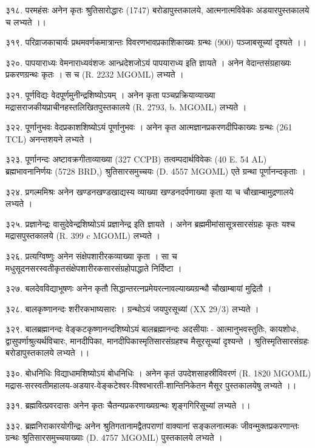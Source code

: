 ३१८. परमहंसः
अनेन कृतः श्रुतिसारोद्धारः (1747) बरोडापुस्तकालये, आत्मनात्मविवेकः अडयारपुस्तकालये च लभ्यते ।।

३१९. परिव्राजकाचार्यः 
प्रथमवर्णकमात्रान्तः विवरणभावप्रकाशिकाख्यः ग्रन्थः (900) पञ्जाबसूच्यां दृश्यते ।।

३२०. पापयाराध्यः
वेमनाराध्यवंशजः आन्ध्रदेशजोऽयं पापयाराध्य इति ज्ञायते । अनेन वेदान्तसंग्रहाख्यः प्रकरणग्रन्थः कृतः । स च (R. 2232 MGOML) लभ्यते ।

३२१. पूर्णविद्यः
वेदपूर्णमुनीन्द्रशिष्योऽयम् । अनेन कृता पञ्चप्रक्रियाव्याख्या मद्रासराजकीयप्राचीनहस्तलिखितपुस्तकालये (R. 2793, b. MGOML) लभ्यते ।

३२२. पूर्णानुभवः
वेदप्रकाशशिष्योऽयं पूर्णानुभवः । अनेन कृत आत्मज्ञानप्रकरणदीपिकाख्यः ग्रन्थः (261 TCL) अनन्तशयने लभ्यते ।

३२३. पूर्णानन्दः
अष्टावक्रगीताव्याख्या (327 CCPB) तत्वम्पदार्थविवेकः (40 E. 54 AL) ब्रह्मभावनानिर्णयः (5728 BRD,) श्रुतिसारसमुच्चयः (D. 4557 MGOML) एते ग्रन्था पूर्णानन्दकृताः ।

३२४. प्रगल्ममिश्रः
अनेन खण्डनखण्डखाद्यस्य व्याख्या खण्डनदर्पणाख्या कृता या च चौखाम्बामुद्रणालये लभ्यते ।

३२५. प्रज्ञानेन्द्रः
वासुदेवेन्द्रशिष्योऽयं प्रज्ञानेन्द्र इति ज्ञायते । अनेन ब्रह्ममीमांसासूत्रसारसंग्रहः कृतः यश्च मद्रासपुस्तकालये (R. 399 c MGOML) लभ्यते ।

३२६. प्रत्यग्विष्णुः
अनेन संक्षेपशारीरकव्याख्या कृता । सा च मधुसूदनसरस्वतीकृतसंक्षेपशारीरकसारसंग्रहोपाद्धाते निर्दिष्टा ।

३२७. बलदेवविद्याभूषणः 
अनेन कृतौ सिद्धान्तरत्नप्रमेयरत्नावल्याख्यग्रन्थौ चौखाम्बायां मुद्रितौ ।

३२८. बालकृष्णानन्दः
शरीरकभाष्यसारः । ग्रन्थोऽयं जयपुरसूच्यां (XX 29/3) लभ्यते ।

३२९. बालब्रह्मानन्दः 
वेङ्कटकृष्णानन्दशिष्योऽयं बालब्रह्मानन्दः अदसीयाः - आत्मानुभवस्तुतिः, कायशोधः, द्वासुपर्णाश्रुत्यर्थविचारः, मानदीपिका, मानदीपिकास्मृतिसारसंग्रहश्च मैसूरसूच्यां दृश्यन्ते । श्रुतिस्मृतिसारसंग्रहः बरोडापुस्तकालये लभ्यते ।।

३३०. बोधनिधिः
विद्याधामशिष्योऽयं बोधनिधिः । अनेन कृतं उपदेशसाहस्रीविवरणं (R. 1820 MGOML) मद्रास-सरस्वतीमहालय-अडयार-वेङ्कटेश्वर-विश्वभारती-शान्तिनिकेतन मैसूर पुस्तकालयेषु लभ्यते ।।

३३१. ब्रह्मवित्प्रवरदासः
अनेन कृतः चैतन्यप्रकरणाख्यग्रन्थः शृङ्गगिरिसूच्यां लभ्यते ।।

३३२. ब्रह्मनिराकारयोगीन्द्रः
अनेन श्रुतिगतानामद्वैतपराणां वाक्यानां सङ्कलनात्मकः जीवन्मुक्तप्रकरणान्तः ग्रन्थः श्रुतिसारसमुच्चयाख्याः (D. 4757 MGOML) पुस्तकालये लभ्यते ।

